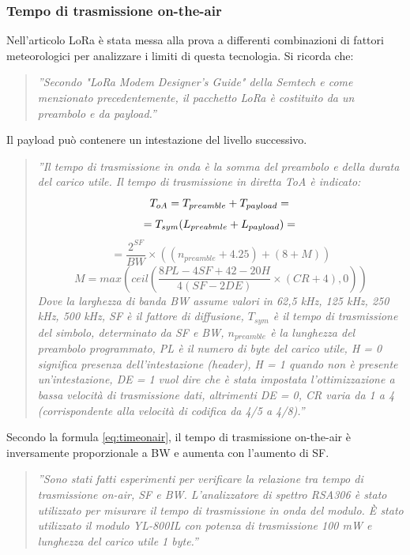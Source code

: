 \documentclass[a4paper]{report} %
\begin{document}
\subsubsection{Tempo di trasmissione on-the-air}
Nell'articolo \cite{art:rif.44} LoRa è stata messa alla prova a differenti combinazioni di fattori meteorologici per analizzare i limiti di questa tecnologia. Si ricorda che:
\begin{quote}
	\textit{''Secondo "LoRa Modem Designer’s Guide" della Semtech e come menzionato precedentemente, il pacchetto LoRa è costituito da un preambolo e da payload.''} 
\end{quote}
Il payload può contenere un intestazione del livello successivo.
\begin{quote} 
	\textit{''Il tempo di trasmissione in onda è la somma del preambolo e della durata del carico utile. Il tempo di trasmissione in diretta ToA è indicato:
\begin{equation}
T_{oA} = T_{preamble} + T_{payload} = \\
\end{equation}
\begin{equation}
= T_{sym}(L_{preabmle}+L_{payload}) = \\
\end{equation}
\begin{equation}
\label{eq:timeonair}
= \frac{2^{SF}}{BW}\times((n_{preamble}+4.25)+(8+M))
\end{equation}
\begin{equation}
M = max(ceil(\frac{8PL-4SF+42-20H}{4(SF-2DE)}\times(CR+4),0))
\end{equation}
	Dove la larghezza di banda BW assume valori in {62,5 kHz, 125 kHz, 250 kHz, 500 kHz}, SF è il fattore di diffusione, $T_{sym}$ è il tempo di trasmissione del simbolo, determinato da SF e BW, $n_{preamble}$ è la lunghezza del preambolo programmato, PL è il numero di byte del carico utile, H = 0 significa presenza dell'intestazione (header), H = 1 quando non è presente un'intestazione, DE = 1 vuol dire che è stata impostata l'ottimizzazione a bassa velocità di trasmissione dati, altrimenti DE = 0, CR varia da 1 a 4 (corrispondente alla velocità di codifica da 4/5 a 4/8).''} 
\end{quote}	
Secondo la formula \ref{eq:timeonair}, il tempo di trasmissione on-the-air è inversamente proporzionale a BW e aumenta con l'aumento di SF.
\begin{quote}
	\textit{''Sono stati fatti esperimenti per verificare la relazione tra tempo di trasmissione on-air, SF e BW. L'analizzatore di spettro RSA306 è stato utilizzato per misurare il tempo di trasmissione in onda del modulo. È stato utilizzato il modulo YL-800IL con potenza di trasmissione 100 mW e lunghezza del carico utile 1 byte.''} 
\end{quote}
\end{document}
